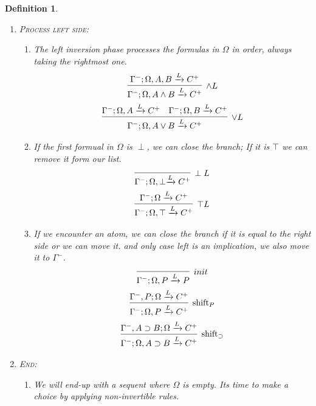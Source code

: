 \documentclass{article}
\theoremstyle{plain}
\newtheorem{definition}[theorem]{Definition}
\theoremstyle{nonumberplain}
\begin{document}
\begin{definition}
\begin{enumerate}
\begin{enumerate}
		$$
		\begin{gathered}
		\infer[\text{LR}_\vee]{\Gamma^-; \Omega \xrightarrow{R} A \vee B}{\Gamma^-; \Omega \xrightarrow{L} A \vee B} \\
		\infer[\text{LR}_\perp]{\Gamma^-; \Omega \xrightarrow{R} \perp}{\Gamma^-; \Omega \xrightarrow{L} \perp}
		\end{gathered}
		$$
	\end{enumerate}
	\item \textsc{Process left side}:
	\begin{enumerate}
		\item The left inversion phase processes the formulas in $\Omega$ in order, always taking the rightmost one. 
		$$
		\begin{gathered}
		\infer[\wedge L]{\Gamma^-; \Omega, A\wedge B \xrightarrow{L} C^+}{\Gamma^-; \Omega, A, B \xrightarrow{L}C^+}\\
		\infer[\vee L]{\Gamma^-; \Omega, A \vee B \xrightarrow{L} C^+}{\Gamma^-; \Omega,A \xrightarrow{L} C^+& \Gamma^-; \Omega,B \xrightarrow{L} C^+}
		\end{gathered}
		$$
		\item If the first formual in $\Omega$ is $\perp$, we can close the branch; If it is $\top$ we can  remove it form our list.
		$$
		\begin{gathered}
		\infer[\perp L]{\Gamma^-; \Omega,\perp \xrightarrow{L} C^+}{} \\
		\infer[\top L]{\Gamma^-; \Omega, \top \xrightarrow{L} C^+}{\Gamma^-; \Omega  \xrightarrow{L} C^+}
		\end{gathered}
		$$
		\item If we encounter an atom, we can close the branch if it is equal to the right side or we can move it. and only case left is an implication, we also move it to $\Gamma^-$. 
		$$
		\begin{gathered}
		\infer[init]{\Gamma^-; \Omega,P \xrightarrow{L} P}{} \\
		\infer[\text{shift}_P]{\Gamma^-; \Omega,P \xrightarrow{L} C^+}{\Gamma^-, P; \Omega \xrightarrow{L} C^+} \\
		\infer[\text{shift}_\supset]{\Gamma^-; \Omega,A \supset B \xrightarrow{L} C^+}{\Gamma^-,A \supset B; \Omega \xrightarrow{L} C^+} \\
		\end{gathered}
		$$
	\end{enumerate}
	\item \textsc{End}: 
	\begin{enumerate}
		\item We will end-up with a sequent where $\Omega$ is empty. Its time to make a choice by applying non-invertible rules.

\end{enumerate}
\end{enumerate}
\end{definition}
\end{document}
